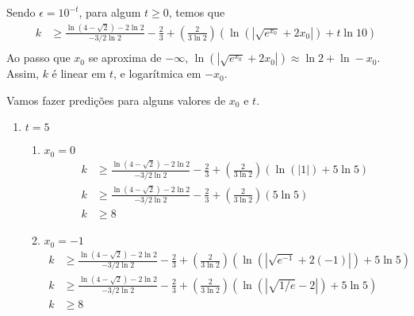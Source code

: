 \documentclass{article}
\begin{document}
    Sendo $\epsilon = 10^{-t}$, para algum $t \geq 0$, temos que
    \begin{align*}
         k &\geq \frac{\ln(4 - \sqrt{2}) - 2\ln 2}{-3/2 \ln 2} - \frac{2}{3} +
        \left(\frac{2}{3\ln 2}\right)(\ln(|\sqrt{e^{x_0}} + 2x_0|) + t \ln 10)\\
    \end{align*}
    Ao passo que $x_0$ se aproxima de $-\infty$, $\ln(|\sqrt{e^{x_0}} + 2x_0|) \approx \ln 2 + \ln -x_0$.\\
    Assim, $k$ é linear em $t$, e logarítmica em $-x_0$.
    
    Vamos fazer predições para alguns valores de $x_0$ e $t$.
    \begin{enumerate}
    \item $t = 5$
        \begin{enumerate}
            \item $x_0 = 0$
            \begin{align*}
                k &\geq \frac{\ln(4 - \sqrt{2}) - 2\ln 2}{-3/2 \ln 2} - \frac{2}{3} +
                \left(\frac{2}{3\ln 2}\right)(\ln(|1|) + 5 \ln 5)\\
                k &\geq \frac{\ln(4 - \sqrt{2}) - 2\ln 2}{-3/2 \ln 2} - \frac{2}{3} +
                \left(\frac{2}{3\ln 2}\right)(5 \ln 5)\\
                k & \geq 8
            \end{align*}

            \item $x_0 = -1$
            \begin{align*}
                k &\geq \frac{\ln(4 - \sqrt{2}) - 2\ln 2}{-3/2 \ln 2} - \frac{2}{3} +
                \left(\frac{2}{3\ln 2}\right)(\ln(|\sqrt{e^{-1}} + 2(-1)|) + 5 \ln 5)\\
                k &\geq \frac{\ln(4 - \sqrt{2}) - 2\ln 2}{-3/2 \ln 2} - \frac{2}{3} +
                \left(\frac{2}{3\ln 2}\right)(\ln(|\sqrt{1/e} - 2|) + 5 \ln 5)\\
                k & \geq 8
            \end{align*}


\end{enumerate}
\end{enumerate}
\end{document}
